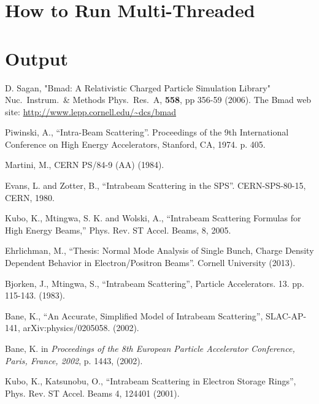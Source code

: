 \documentclass[11pt]{article}
\begin{document}
\section{How to Run Multi-Threaded} 
\label{s:multi}


\section{Output} 
\label{s:output}


\begin{thebibliography}{9}

D. Sagan,
"Bmad: A Relativistic Charged Particle Simulation Library"
Nuc.\ Instrum.\ \& Methods Phys.\ Res.\ A, {\bf 558}, pp 356-59 (2006).
The Bmad web site:
\hfill\break
\hspace*{0.3in} \url{http://www.lepp.cornell.edu/~dcs/bmad}

Piwinski, A., ``Intra-Beam Scattering''.
Proceedings of the 9th International Conference on High Energy Accelerators,
Stanford, CA, 1974. p. 405.

Martini, M., CERN PS/84-9 (AA) (1984).

Evans, L. and Zotter, B., ``Intrabeam Scattering in the SPS''.
CERN-SPS-80-15, CERN, 1980.

Kubo, K., Mtingwa, S. K. and Wolski, A., ``Intrabeam Scattering Formulas for 
High Energy Beams,'' Phys. Rev. ST Accel. Beams, 8, 2005.

Ehrlichman, M., ``Thesis: Normal Mode Analysis of Single Bunch, Charge Density
Dependent Behavior in Electron/Positron Beams''.  Cornell University (2013).

Bjorken, J., Mtingwa, S., ``Intrabeam Scattering'', Particle Accelerators. 13. 
pp. 115-143. (1983).

Bane, K., ``An Accurate, Simplified Model of Intrabeam Scattering'', SLAC-AP-141,
arXiv:physics/0205058. (2002).

Bane, K. in {\it Proceedings of the 8th European Particle Accelerator Conference, Paris,
France, 2002}, p. 1443, (2002).

Kubo, K., Katsunobu, O., ``Intrabeam Scattering in Electron Storage Rings'',
Phys. Rev. ST Accel. Beams 4, 124401 (2001).

\end{thebibliography}
\end{document}

